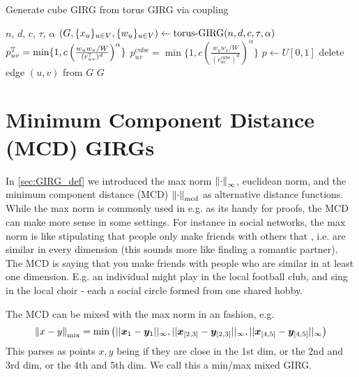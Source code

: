 \begin{algorithm}
    \caption{Generate cube GIRG from torus GIRG via coupling}\label{alg:cube_coupling}
    \begin{algorithmic}
    \Require $n$, $d$, $c$, $\tau$, $\alpha$
    \State $\left ( G, \{x_u\}_{u \in V}, \{w_u\}_{u \in V} \right ) \gets \text{torus-}\mathrm{GIRG}(n,d,c,\tau, \alpha)$
        \State $p_{uv}^{\mathbb{T}} = \min \{1, c \left (
            \frac{w_u w_v / W}{(r_{uv}^{\mathbb{T}})^d} \right )^\alpha \}$
        \State $p_{uv}^\text{cube} = \min \{1, c \left (
            \frac{w_u w_v / W}{(r_{uv}^\text{cube})^d} \right )^\alpha \}$
        \State $p \gets U[0,1]$
            \State delete edge $(u,v)$ from $G$
        \EndIf
    \EndFor
    \State \Return $G$
\end{algorithmic}
\end{algorithm}




\section{Minimum Component Distance (MCD) GIRGs}
In \cref{sec:GIRG_def} we introduced the max norm $\left\lVert \cdot\right\rVert_\infty$, euclidean norm, and the minimum component distance (MCD) $\left\lVert \cdot\right\rVert_{\mathrm{mcd}}$ as alternative distance functions.
While the max norm is commonly used in e.g. \cite{bringmann2019geometric} as its handy for proofs, the MCD can make more sense in some settings. For instance in social networks, the max norm is like stipulating that people only make friends with others that , i.e. are similar in every dimension (this sounds more like finding a romantic partner). The MCD is saying that you make friends with people who are similar in at least one dimension. E.g. an individual might play in the local football club, and sing in the local choir - each a social circle formed from one shared hobby.

The MCD can be mixed with the max norm in an  fashion, e.g.
\begin{equation}
    \left\lVert x - y\right\rVert_\text{mix} = \min \left ( ||\bm{x}_1 - \bm{y}_{1}||_\infty, ||\bm{x}_{[2,3]} - \bm{y}_{[2,3]}||_\infty, ||\bm{x}_{[4,5]} - \bm{y}_{[4,5]}||_\infty \right )
\end{equation}
This parses as points $x, y$ being  if they are close in the 1st dim, or the 2nd and 3rd dim, or the 4th and 5th dim. We call this a min/max mixed GIRG.


